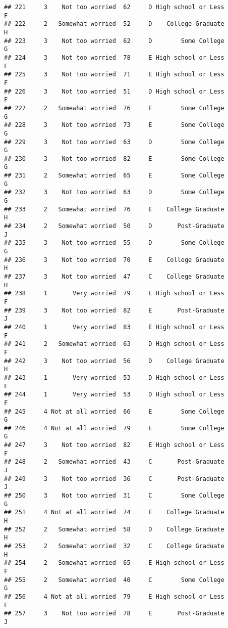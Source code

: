 \documentclass[
]{article}
\begin{document}
\begin{verbatim}
## 221     3    Not too worried  62     D High school or Less         F
## 222     2   Somewhat worried  52     D    College Graduate         H
## 223     3    Not too worried  62     D        Some College         G
## 224     3    Not too worried  78     E High school or Less         F
## 225     3    Not too worried  71     E High school or Less         F
## 226     3    Not too worried  51     D High school or Less         F
## 227     2   Somewhat worried  76     E        Some College         G
## 228     3    Not too worried  73     E        Some College         G
## 229     3    Not too worried  63     D        Some College         G
## 230     3    Not too worried  82     E        Some College         G
## 231     2   Somewhat worried  65     E        Some College         G
## 232     3    Not too worried  63     D        Some College         G
## 233     2   Somewhat worried  76     E    College Graduate         H
## 234     2   Somewhat worried  50     D       Post-Graduate         J
## 235     3    Not too worried  55     D        Some College         G
## 236     3    Not too worried  70     E    College Graduate         H
## 237     3    Not too worried  47     C    College Graduate         H
## 238     1       Very worried  79     E High school or Less         F
## 239     3    Not too worried  82     E       Post-Graduate         J
## 240     1       Very worried  83     E High school or Less         F
## 241     2   Somewhat worried  63     D High school or Less         F
## 242     3    Not too worried  56     D    College Graduate         H
## 243     1       Very worried  53     D High school or Less         F
## 244     1       Very worried  53     D High school or Less         F
## 245     4 Not at all worried  66     E        Some College         G
## 246     4 Not at all worried  79     E        Some College         G
## 247     3    Not too worried  82     E High school or Less         F
## 248     2   Somewhat worried  43     C       Post-Graduate         J
## 249     3    Not too worried  36     C       Post-Graduate         J
## 250     3    Not too worried  31     C        Some College         G
## 251     4 Not at all worried  74     E    College Graduate         H
## 252     2   Somewhat worried  58     D    College Graduate         H
## 253     2   Somewhat worried  32     C    College Graduate         H
## 254     2   Somewhat worried  65     E High school or Less         F
## 255     2   Somewhat worried  40     C        Some College         G
## 256     4 Not at all worried  79     E High school or Less         F
## 257     3    Not too worried  78     E       Post-Graduate         J

\end{verbatim}
\end{document}
